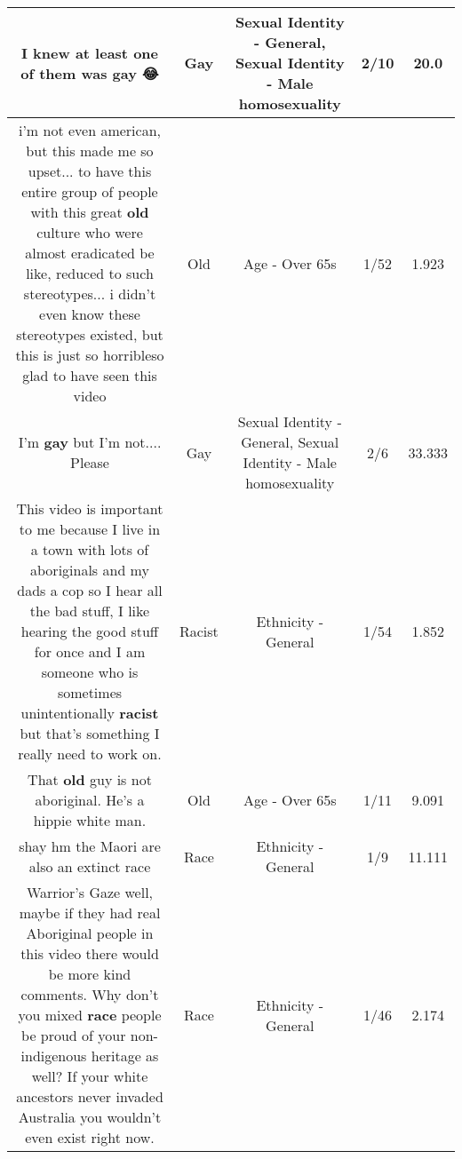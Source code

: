 \documentclass[11pt]{article}
\newlength\mylength
\begin{document}
\begin{center}
\begin{longtable}{|C{.65\mylength}|C{.30\mylength}|C{.12\mylength}|C{.12\mylength}|C{.12\mylength}|}
  \small I knew at least one of them was \textbf{g\textbf{ay}} 😂\normalsize   & Gay & Sexual Identity - General, Sexual Identity - Male homosexuality & 2/10 & 20.0 \\  \hline
  \small i'm not even american, but this made me so upset... to have this entire group of people with this great \textbf{old} culture who were almost eradicated be like, reduced to such stereotypes... i didn't even know these stereotypes existed, but this is just so horribleso glad to have seen this video\normalsize   & Old & Age - Over 65s & 1/52 & 1.923 \\  \hline
  \small I'm \textbf{g\textbf{ay}} but I'm not.... Please\normalsize   & Gay & Sexual Identity - General, Sexual Identity - Male homosexuality & 2/6 & 33.333 \\  \hline
  \small This video is important to me because I live in a town with lots of aboriginals and my dads a cop so I hear all the bad stuff, I like hearing the good stuff for once and I am someone who is sometimes unintentionally \textbf{racist} but that's something I really need to work on.\normalsize   & Racist & Ethnicity - General & 1/54 & 1.852 \\  \hline
  \small That \textbf{old} guy is not aboriginal. He's a hippie white man.\normalsize   & Old & Age - Over 65s & 1/11 & 9.091 \\  \hline
  \small  shay hm the Maori are also an extinct race\normalsize   & Race & Ethnicity - General & 1/9 & 11.111 \\  \hline
  \small Warrior's Gaze well, maybe if they had real Aboriginal people in this video there would be more kind comments.  Why don't you mixed \textbf{race} people be proud of your non-indigenous heritage as well? If your white ancestors never invaded Australia you wouldn't even exist right now.\normalsize   & Race & Ethnicity - General & 1/46 & 2.174 \\  \hline

\end{longtable}
\end{center}
\end{document}
